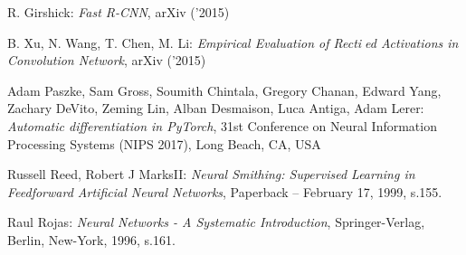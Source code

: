 \begin{thebibliography}{99}
   R. Girshick:
  \emph{Fast R-CNN},
  arXiv ('2015)

   B. Xu, N. Wang, T. Chen, M. Li:
  \emph{Empirical Evaluation of Rectied Activations in Convolution Network},
   arXiv ('2015)

    Adam Paszke, Sam Gross, Soumith Chintala, Gregory Chanan,
   Edward Yang, Zachary DeVito, Zeming Lin, Alban Desmaison, Luca Antiga, Adam Lerer:
   \emph{Automatic differentiation in PyTorch}, 31st Conference on Neural Information
   Processing Systems (NIPS 2017), Long Beach, CA, USA

    Russell Reed,  Robert J MarksII:
  \emph{Neural Smithing: Supervised Learning in Feedforward Artificial Neural Networks},
  Paperback – February 17, 1999, s.155.

   Raul Rojas:
  \emph{Neural Networks - A Systematic Introduction},
  Springer-Verlag, Berlin, New-York, 1996, s.161.


\end{thebibliography}
